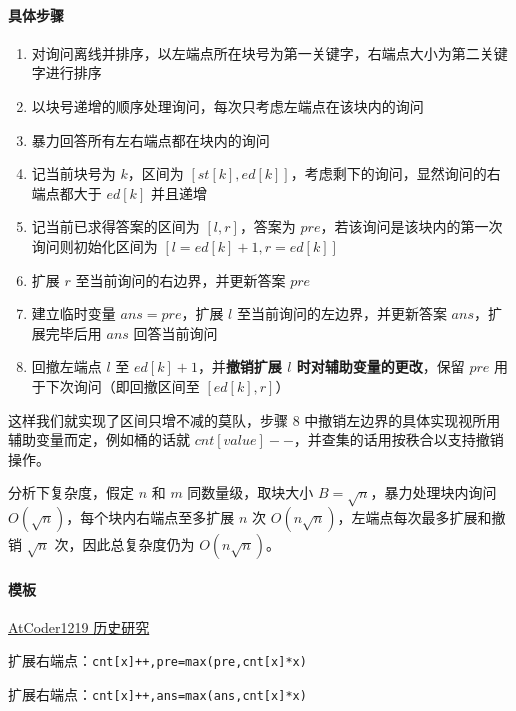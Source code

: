 \documentclass[
]{article}
\begin{document}
\hypertarget{ux5177ux4f53ux6b65ux9aa4}{%
\paragraph{具体步骤}\label{ux5177ux4f53ux6b65ux9aa4}}

\begin{enumerate}
\def\labelenumi{\arabic{enumi}.}
\item
  对询问离线并排序，以左端点所在块号为第一关键字，右端点大小为第二关键字进行排序
\item
  以块号递增的顺序处理询问，每次只考虑左端点在该块内的询问
\item
  暴力回答所有左右端点都在块内的询问
\item
  记当前块号为 \(k\)，区间为
  \([st[k],ed[k]]\)，考虑剩下的询问，显然询问的右端点都大于 \(ed[k]\)
  并且递增
\item
  记当前已求得答案的区间为 \([l,r]\)，答案为
  \(pre\)，若该询问是该块内的第一次询问则初始化区间为
  \([l=ed[k]+1, r=ed[k]]\)
\item
  扩展 \(r\) 至当前询问的右边界，并更新答案 \(pre\)
\item
  建立临时变量 \(ans=pre\)，扩展 \(l\) 至当前询问的左边界，并更新答案
  \(ans\)，扩展完毕后用 \(ans\) 回答当前询问
\item
  回撤左端点 \(l\) 至 \(ed[k]+1\)，并\textbf{撤销扩展 \(l\)
  时对辅助变量的更改}，保留 \(pre\) 用于下次询问（即回撤区间至
  \([ed[k],r]\)）
\end{enumerate}

这样我们就实现了区间只增不减的莫队，步骤 8
中撤销左边界的具体实现视所用辅助变量而定，例如桶的话就
\(cnt[value]--\)，并查集的话用按秩合以支持撤销操作。

分析下复杂度，假定 \(n\) 和 \(m\) 同数量级，取块大小
\(B = \sqrt{n}\)，暴力处理块内询问
\(O(\sqrt{n})\)，每个块内右端点至多扩展 \(n\) 次
\(O(n\sqrt{n})\)，左端点每次最多扩展和撤销 \(\sqrt{n}\)
次，因此总复杂度仍为 \(O(n\sqrt{n})\)。

\hypertarget{ux6a21ux677f-2}{%
\paragraph{模板}\label{ux6a21ux677f-2}}

\href{https://www.luogu.com.cn/problem/AT1219}{AtCoder1219 历史研究}

扩展右端点：\texttt{cnt{[}x{]}++,pre=max(pre,cnt{[}x{]}*x)}

扩展右端点：\texttt{cnt{[}x{]}++,ans=max(ans,cnt{[}x{]}*x)}
\end{document}
